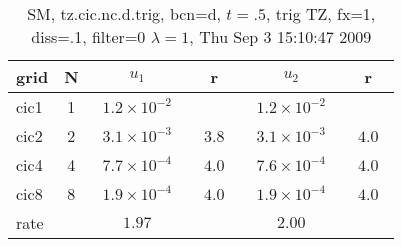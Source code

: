 \begin{table}[hbt]\tableFont %
\begin{center}
\begin{tabular}{|l|c|c|c|c|c|} \hline 
grid  & N &  $u_1$ & r & $u_2$  & r \\ \hline 
                cic1 &     1 & ~$1.2\times10^{ -2}$~ &           & ~$1.2\times10^{ -2}$~ &            \\ \hline
                cic2 &     2 & ~$3.1\times10^{ -3}$~ & ~$  3.8$~ & ~$3.1\times10^{ -3}$~ & ~$  4.0$~  \\ \hline
                cic4 &     4 & ~$7.7\times10^{ -4}$~ & ~$  4.0$~ & ~$7.6\times10^{ -4}$~ & ~$  4.0$~  \\ \hline
                cic8 &     8 & ~$1.9\times10^{ -4}$~ & ~$  4.0$~ & ~$1.9\times10^{ -4}$~ & ~$  4.0$~  \\ \hline
    rate             &       &       $1.97$         &       &       $2.00$         &        \\ \hline
\end{tabular}
\caption{SM, tz.cic.nc.d.trig, bcn=d, $t=.5$, trig TZ, fx=1, diss=.1, filter=0 $\lambda=1$, Thu Sep  3 15:10:47 2009}\label{table:tz.cic.nc.d.trig}
\end{center}
\end{table}
